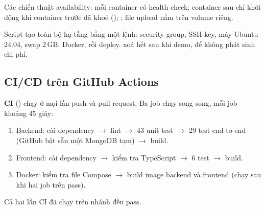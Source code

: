 \documentclass[11pt, a4paper]{article}
\begin{document}
Các chiến thuật availability: mỗi container có health check; container sau chỉ khởi động khi container trước đã khoẻ (); ; file upload nằm trên volume riêng.

Script  tạo toàn bộ hạ tầng bằng một lệnh: security group, SSH key, máy Ubuntu 24.04, swap 2\,GB, Docker, rồi deploy.  xoá hết sau khi demo, để không phát sinh chi phí.

\subsection{CI/CD trên GitHub Actions}
\textbf{CI} () chạy ở mọi lần push và pull request. Ba job chạy song song, mỗi job khoảng 45 giây:
\begin{enumerate}
  \item Backend: cài dependency $\rightarrow$ lint $\rightarrow$ 43 unit test $\rightarrow$ 29 test end-to-end (GitHub bật sẵn một MongoDB tạm) $\rightarrow$ build.
  \item Frontend: cài dependency $\rightarrow$ kiểm tra TypeScript $\rightarrow$ 6 test $\rightarrow$ build.
  \item Docker: kiểm tra file Compose $\rightarrow$ build image backend và frontend (chạy sau khi hai job trên pass).
\end{enumerate}
Cả hai lần CI đã chạy trên nhánh  đều pass.
\end{document}
